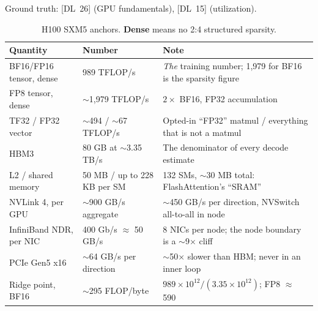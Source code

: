 \noindent Ground truth: [DL~26] (GPU fundamentals), [DL~15] (utilization).

\begin{table}[H]
\centering
\small
\caption{H100 SXM5 anchors. \textbf{Dense} means no 2:4 structured sparsity.}
\begin{tabularx}{\textwidth}{@{}llX@{}}
\toprule
\textbf{Quantity} & \textbf{Number} & \textbf{Note} \\
\midrule
BF16/FP16 tensor, dense & 989 TFLOP/s & \textit{The} training number; 1{,}979 for BF16 is the sparsity figure \\
FP8 tensor, dense & $\sim$1{,}979 TFLOP/s & $2\times$ BF16, FP32 accumulation \\
TF32 / FP32 vector & $\sim$494 / $\sim$67 TFLOP/s & Opted-in ``FP32'' matmul / everything that is not a matmul \\
HBM3 & 80 GB at $\sim$3.35 TB/s & The denominator of every decode estimate \\
L2 / shared memory & 50 MB / up to 228 KB per SM & 132 SMs, $\sim$30 MB total: FlashAttention's ``SRAM'' \\
NVLink 4, per GPU & $\sim$900 GB/s aggregate & $\sim$450 GB/s per direction, NVSwitch all-to-all in node \\
InfiniBand NDR, per NIC & 400 Gb/s $\approx$ 50 GB/s & 8 NICs per node; the node boundary is a $\sim$9$\times$ cliff \\
PCIe Gen5 x16 & $\sim$64 GB/s per direction & $\sim$50$\times$ slower than HBM; never in an inner loop \\
Ridge point, BF16 & $\sim$295 FLOP/byte & $989{\times}10^{12}/(3.35{\times}10^{12})$; FP8 $\approx$ 590 \\
\bottomrule
\end{tabularx}
\end{table}

